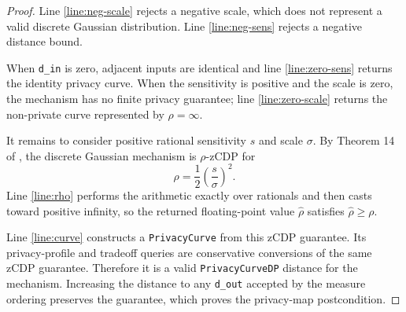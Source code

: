 \documentclass{article}
\begin{document}
\begin{proof}
Line \ref{line:neg-scale} rejects a negative scale, which does not represent a
valid discrete Gaussian distribution. Line \ref{line:neg-sens} rejects a
negative distance bound.

When \texttt{d\_in} is zero, adjacent inputs are identical and line
\ref{line:zero-sens} returns the identity privacy curve. When the sensitivity
is positive and the scale is zero, the mechanism has no finite privacy
guarantee; line \ref{line:zero-scale} returns the non-private curve represented
by $\rho = \infty$.

It remains to consider positive rational sensitivity $s$ and scale $\sigma$.
By Theorem 14 of \cite{CKS20}, the discrete Gaussian mechanism is
$\rho$-zCDP for
\[
    \rho = \frac{1}{2}\left(\frac{s}{\sigma}\right)^2.
\]
Line \ref{line:rho} performs the arithmetic exactly over rationals and then
casts toward positive infinity, so the returned floating-point value
$\widehat{\rho}$ satisfies $\widehat{\rho} \geq \rho$.

Line \ref{line:curve} constructs a \texttt{PrivacyCurve} from this zCDP
guarantee. Its privacy-profile and tradeoff queries are conservative
conversions of the same zCDP guarantee. Therefore it is a valid
\texttt{PrivacyCurveDP} distance for the mechanism. Increasing the distance to
any \texttt{d\_out} accepted by the measure ordering preserves the guarantee,
which proves the privacy-map postcondition.
\end{proof}



\end{document}
